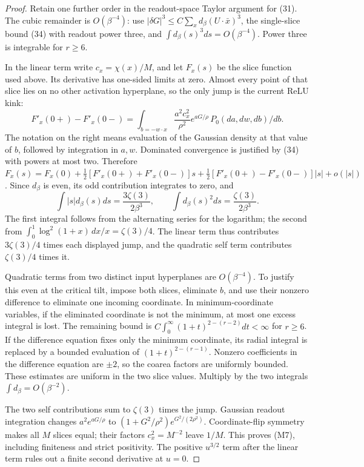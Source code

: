 \documentclass[11pt]{article}
\begin{document}
\begin{proof}
Retain one further order in the readout-space Taylor argument for (31).
The cubic remainder is $O(\beta^{-4})$: use
$|\delta G|^3\le C\sum_x d_\beta(U\cdot\bar x)^3$,
the single-slice bound (34) with readout power three, and
$\int d_\beta(s)^3ds=O(\beta^{-4})$.
Power three is integrable for $r\ge6$.

In the linear term write $c_x=\chi(x)/M$, and let $F_x(s)$ be
the slice function used above. Its derivative has one-sided limits
at zero. Almost every point of that slice lies on no other activation
hyperplane, so the only jump is the current ReLU kink:
\[
 F'_x(0+)-F'_x(0-)
   =\int_{b=-w\cdot x}\frac{a^2c_x^2}{\rho^2}
                         e^{aG/\rho}\,P_0(da,dw,db)/db.
\]
The notation on the right means evaluation of the Gaussian density
at that value of $b$, followed by integration in $a,w$.
Dominated convergence is justified by (34) with powers at most two.
Therefore
$F_x(s)=F_x(0)+\frac12[F'_x(0+)+F'_x(0-)]s
+\frac12[F'_x(0+)-F'_x(0-)]|s|+o(|s|)$.
Since $d_\beta$ is even, its odd contribution integrates to zero,
and
\[
 \int |s|d_\beta(s)ds=\frac{3\zeta(3)}{2\beta^3},\qquad
 \int d_\beta(s)^2ds=\frac{\zeta(3)}{2\beta^3}.          \tag{M8}
\]
The first integral follows from the alternating series for the logarithm;
the second from
$\int_0^1\log^2(1+x)\,dx/x=\zeta(3)/4$.
The linear term thus contributes $3\zeta(3)/4$ times each displayed
jump, and the quadratic self term contributes $\zeta(3)/4$ times it.

Quadratic terms from two distinct input hyperplanes are
$O(\beta^{-4})$. To justify this even at the critical tilt, impose
both slices, eliminate $b$, and use their nonzero difference to
eliminate one incoming coordinate. In minimum-coordinate variables,
if the eliminated coordinate is not the minimum, at most one excess
integral is lost. The remaining bound is
$C\int_0^\infty(1+t)^{2-(r-2)}dt<\infty$ for $r\ge6$.
If the difference equation fixes only the minimum coordinate,
its radial integral is replaced by a bounded evaluation of
$(1+t)^{2-(r-1)}$. Nonzero coefficients in the difference equation
are $\pm2$, so the coarea factors are uniformly bounded.
These estimates are uniform in the two slice values.
Multiply by the two integrals $\int d_\beta=O(\beta^{-2})$.

The two self contributions sum to $\zeta(3)$ times the jump.
Gaussian readout integration changes
$a^2e^{aG/\rho}$ to $(1+G^2/\rho^2)e^{G^2/(2\rho^2)}$.
Coordinate-flip symmetry makes all $M$ slices equal; their factors
$c_x^2=M^{-2}$ leave $1/M$. This proves (M7), including finiteness
and strict positivity. The positive $u^{3/2}$ term after the linear
term rules out a finite second derivative at $u=0$.
\end{proof}
\end{document}
